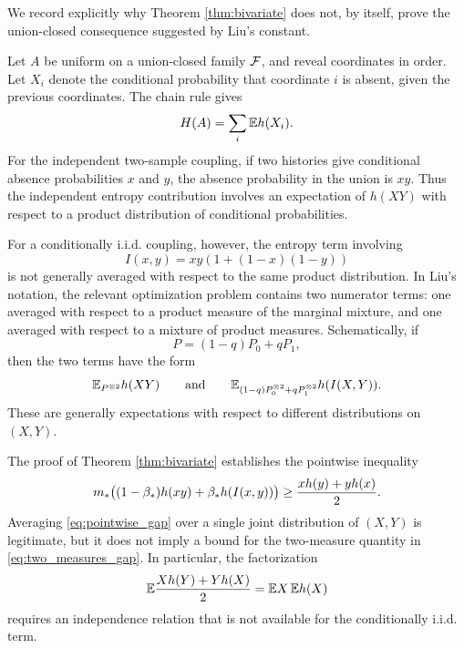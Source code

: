 We record explicitly why Theorem \ref{thm:bivariate} does not, by itself,
prove the union-closed consequence suggested by Liu's constant.

Let \(A\) be uniform on a union-closed family \(\mathcal{F}\), and reveal coordinates
in order.  Let \(X_i\) denote the conditional probability that coordinate \(i\)
is absent, given the previous coordinates.  The chain rule gives
\begin{equation}\label{eq:gap_chain}
  H(A)=\sum_i \mathbb{E} h(X_i).
\end{equation}
For the independent two-sample coupling, if two histories give conditional
absence probabilities \(x\) and \(y\), the absence probability in the union is
\(xy\).  Thus the independent entropy contribution involves an expectation of
\(h(XY)\) with respect to a product distribution of conditional probabilities.

For a conditionally i.i.d. coupling, however, the entropy term involving
\begin{equation}
  I(x,y)=xy(1+(1-x)(1-y))
\end{equation}
is not generally averaged with respect to the same product distribution.  In
Liu's notation, the relevant optimization problem contains two numerator
terms: one averaged with respect to a product measure of the marginal mixture,
and one averaged with respect to a mixture of product measures.  Schematically,
if
\begin{equation}
  P=(1-q)P_0+qP_1,
\end{equation}
then the two terms have the form
\begin{equation}\label{eq:two_measures_gap}
  \mathbb{E}_{P^{\otimes2}} h(XY)
  \qquad\text{and}\qquad
  \mathbb{E}_{(1-q)P_0^{\otimes2}+qP_1^{\otimes2}} h(I(X,Y)).
\end{equation}
These are generally expectations with respect to different distributions on
\((X,Y)\).

The proof of Theorem \ref{thm:bivariate} establishes the pointwise inequality
\begin{equation}\label{eq:pointwise_gap}
  m_*\bigl((1-\beta_*)h(xy)+\beta_* h(I(x,y))\bigr)
  \ge \frac{x h(y)+y h(x)}2.
\end{equation}
Averaging \eqref{eq:pointwise_gap} over a single joint distribution of
\((X,Y)\) is legitimate, but it does not imply a bound for the two-measure
quantity in \eqref{eq:two_measures_gap}.  In particular, the factorization
\begin{equation}\label{eq:wrong_factorization_gap}
  \mathbb{E}\frac{Xh(Y)+Yh(X)}2 = \mathbb{E} X\,\mathbb{E} h(X)
\end{equation}
requires an independence relation that is not available for the
conditionally i.i.d. term.

